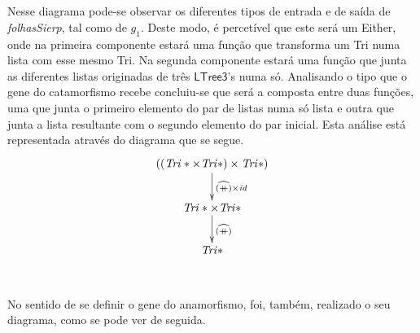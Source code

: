 \documentclass[a4paper]{article}
\newcommand{\Conid}[1]{\mathit{#1}}
\newcommand{\Varid}[1]{\mathit{#1}}
\begin{document}
\\
\\
Nesse diagrama pode-se observar os diferentes tipos de entrada e de saída de \emph{folhasSierp}, tal como de \ensuremath{g_1 }. Deste modo, é percetível que este será um 
Either, onde na primeira componente estará uma função que transforma um Tri numa 
lista com esse mesmo Tri. Na segunda componente estará uma função que junta as
 diferentes listas originadas de três \ensuremath{\mathsf{LTree3}}'s numa só. Analisando o tipo que o
 gene do catamorfismo recebe concluiu-se que será a composta entre duas funções,
 uma que junta o primeiro elemento do par de listas numa só lista e outra que 
junta a lista resultante com o segundo elemento do par inicial. Esta análise está representada através do diagrama que se segue.
\\
\begin{eqnarray*}
\xymatrix@C=2cm{
    \ensuremath{((\Conid{Tri}\mathbin{*}\times\Conid{Tri}\mathbin{*})\times\Conid{Tri}\mathbin{*})}
           \ar[d]^-{\ensuremath{\uncurry{(\mathbin{+\!\!\!+})}\times\Varid{id}}}
\\
    \ensuremath{\Conid{Tri}\mathbin{*}\times\Conid{Tri}\mathbin{*}}
           \ar[d]^{\ensuremath{\uncurry{(\mathbin{+\!\!\!+})}}}
\\
    \ensuremath{\Conid{Tri}\mathbin{*}}
}
\end{eqnarray*}
\\
\\
No sentido de se definir o gene do anamorfismo, foi, também, realizado o seu diagrama, como se pode ver de seguida.
\end{document}

